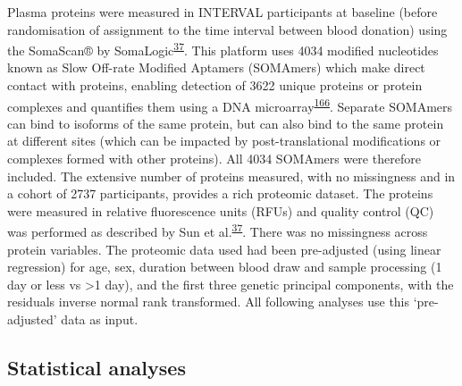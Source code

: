 \documentclass[11pt,twoside]{bristolthesis}
\begin{document}
Plasma proteins were measured in INTERVAL participants at baseline (before randomisation of assignment to the time interval between blood donation) using the SomaScan® by SomaLogic\textsuperscript{\protect\hyperlink{ref-Sun2018}{37}}. This platform uses 4034 modified nucleotides known as Slow Off-rate Modified Aptamers (SOMAmers) which make direct contact with proteins, enabling detection of 3622 unique proteins or protein complexes and quantifies them using a DNA microarray\textsuperscript{\protect\hyperlink{ref-Rohloff2014}{166}}. Separate SOMAmers can bind to isoforms of the same protein, but can also bind to the same protein at different sites (which can be impacted by post-translational modifications or complexes formed with other proteins). All 4034 SOMAmers were therefore included. The extensive number of proteins measured, with no missingness and in a cohort of 2737 participants, provides a rich proteomic dataset. The proteins were measured in relative fluorescence units (RFUs) and quality control (QC) was performed as described by Sun et al.\textsuperscript{\protect\hyperlink{ref-Sun2018}{37}}. There was no missingness across protein variables. The proteomic data used had been pre-adjusted (using linear regression) for age, sex, duration between blood draw and sample processing (1 day or less vs \textgreater1 day), and the first three genetic principal components, with the residuals inverse normal rank transformed. All following analyses use this `pre-adjusted' data as input.

\hypertarget{statistical-analyses}{%
\subsection{Statistical analyses}\label{statistical-analyses}}
\end{document}
